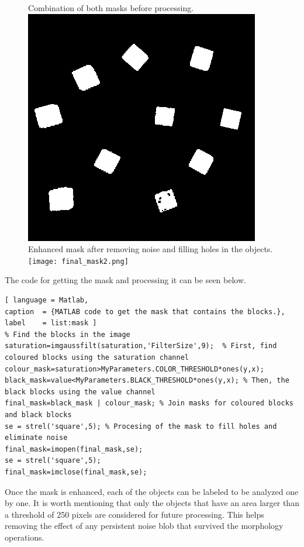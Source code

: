 \begin{figure}[H]
	\captionbox  %
	{
		Combination of both masks before processing.             
		\label{fig:final_mask}                                  
	}                                                                 
	{                                                                  
		\includegraphics[width=.25\textwidth]{figures/final_mask.png}         
	}                                                                    
	\hspace{5pt}                                                          
	\captionbox
	{       
		Enhanced mask after removing noise and filling holes in the objects.
		\label{fig:final_mask2}                                     
	}
	{
		\texttt{[image: final\_mask2.png]}            
	}                                                                             
\end{figure}

The code for getting the mask and processing it can be seen below.
%
\begin{lstlisting}[ language = Matlab,
caption  = {MATLAB code to get the mask that contains the blocks.},
label    = list:mask ]
% Find the blocks in the image
saturation=imgaussfilt(saturation,'FilterSize',9);  % First, find coloured blocks using the saturation channel
colour_mask=saturation>MyParameters.COLOR_THRESHOLD*ones(y,x);
black_mask=value<MyParameters.BLACK_THRESHOLD*ones(y,x); % Then, the black blocks using the value channel
final_mask=black_mask | colour_mask; % Join masks for coloured blocks and black blocks
se = strel('square',5); % Procesing of the mask to fill holes and eliminate noise
final_mask=imopen(final_mask,se);
se = strel('square',5);
final_mask=imclose(final_mask,se);
\end{lstlisting}

Once the mask is enhanced, each of the objects can be labeled to be analyzed one by one. It is worth mentioning that only the objects that have an area larger than a threshold of 250 pixels are considered for future processing. This helps removing the effect of any persistent noise blob that survived the morphology operations.

